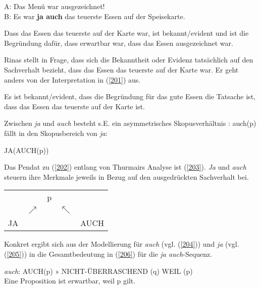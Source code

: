 \begin{exe}
	\ex\label{199} 
	A: Das Menü war ausgezeichnet!\\
	B: Es war \textbf{ja auch} das teuerste Essen auf der Speisekarte.
	\hfill\hbox {\citet[424]{Rinas2007}}
\end{exe}	

\begin{exe}
	\ex\label{200} 
	\glq Dass das Essen das teuerste auf der Karte war, ist bekannt/evident und ist die Begründung dafür, dass erwartbar war, dass das Essen ausgezeichnet 	war.\grq {}
\end{exe}
Rinas stellt in Frage, dass sich die Bekanntheit oder Evidenz tatsächlich auf den Sachverhalt bezieht, dass das Essen das teuerste auf der Karte war. Er geht anders von der Interpretation in (\ref{201}) aus.

\begin{exe}
	\ex\label{201} 
	\glq Es ist bekannt/evident, dass die Begründung für das gute Essen die Tatsache ist, dass das Essen das teuerste auf der Karte ist.\grq {}
\end{exe}				
Zwischen \textit{ja} und \textit{auch} besteht s.E. ein asymmetrisches Skopusverhältnis : auch(p) fällt in den Skopusbereich von \textit{ja}:

\begin{exe}
	\ex\label{202} 
	JA(AUCH(p))
\end{exe}
Das Pendat zu (\ref{202}) entlang von Thurmairs Analyse ist (\ref{203}). \textit{Ja} und \textit{auch} steuern ihre Merkmale jeweils in Bezug auf den ausgedrückten Sachverhalt bei.

\begin{exe}
\ex\label{203}
\begin{tabular}[t]{l@{}l@{}l@{}l@{}l@{}}
  	& & p & & \\
  	& $\nearrow$ & & $\nwarrow$ &\\
  	JA & & & & AUCH\\
\end{tabular}
\end{exe}
Konkret ergibt sich aus der Modellierung für \textit{auch} (vgl. (\ref{204})) und \textit{ja} (vgl. (\ref{205})) in \citet{Rinas2007} die Gesamtbedeutung in (\ref{206}) für die \textit{ja auch}-Sequenz.

\begin{exe}
	\ex\label{204} 
			\textit{auch}: AUCH(p) $»$ NICHT-ÜBERRASCHEND (q) WEIL (p)\\
			\glq Eine Proposition ist erwartbar, weil p gilt.\grq {}
\end{exe}

